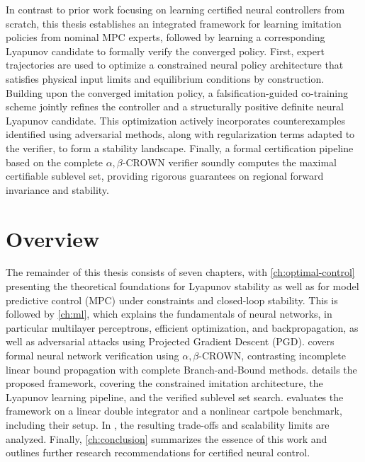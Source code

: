 In contrast to prior work focusing on learning certified neural controllers from scratch, this thesis establishes 
an integrated framework for learning imitation policies from nominal MPC experts, followed by learning a corresponding 
Lyapunov candidate to formally verify the converged policy. 
First, expert trajectories are used to optimize a constrained neural policy architecture that satisfies physical input 
limits and equilibrium conditions by construction.
Building upon the converged imitation policy, a falsification-guided co-training scheme jointly refines the controller and 
a structurally positive definite neural Lyapunov candidate. This optimization actively incorporates counterexamples identified 
using adversarial methods, along with regularization terms adapted to the verifier, to form a stability landscape.
Finally, a formal certification pipeline based on the complete $\alpha,\beta$-CROWN verifier soundly computes the maximal 
certifiable sublevel set, providing rigorous guarantees on regional forward invariance and stability.

\section*{Overview}
\label{subsec:intro-overview}

The remainder of this thesis consists of seven chapters, with \cref{ch:optimal-control} presenting the theoretical foundations for Lyapunov stability 
as well as for model predictive control (MPC) under constraints and closed-loop stability. This is followed by \cref{ch:ml}, which explains the 
fundamentals of neural networks, in particular multilayer perceptrons, efficient optimization, and backpropagation, as well as adversarial attacks 
using Projected Gradient Descent (PGD).  covers formal neural network verification using $\alpha,\beta$-CROWN, 
contrasting incomplete linear bound propagation with complete Branch-and-Bound methods.
 details the proposed framework, covering the constrained imitation architecture, the Lyapunov learning pipeline, and 
the verified sublevel set search.  evaluates the framework on a linear double integrator and a nonlinear cartpole benchmark,
including their setup. In , the resulting trade-offs and scalability limits are analyzed. 
Finally, \cref{ch:conclusion} summarizes the essence of this work and outlines further research recommendations for certified neural control.